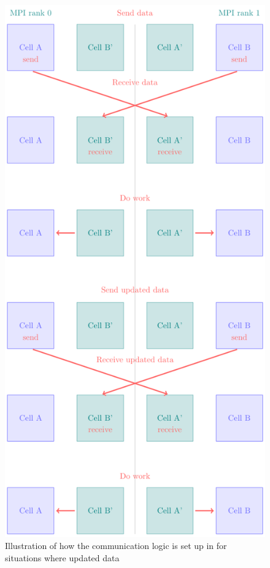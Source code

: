\begin{figure}
 \centering
 \includegraphics[height=.75\textheight]{figures/Meshless/repeated_mpi_comm.pdf}
 \caption{
Illustration of how the communication logic is set up in \swift for situations where updated data
}
\end{figure}
